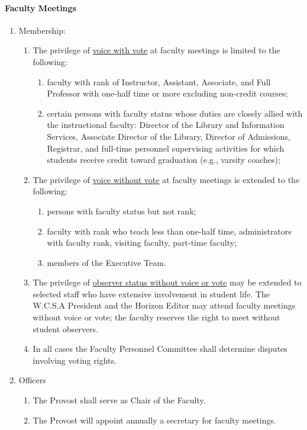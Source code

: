 			\paragraph{Faculty Meetings}
				\label{sec:FacultyMeetings}
				\begin{enumerate}[label=\alph*)]
					\item{Membership:
						\begin{enumerate}[label=\arabic*)]
							\item{The privilege of \underline {voice with vote} at faculty meetings is limited to the following:
								\begin{enumerate}[label=(\alph*)]
									\item{ faculty with rank of Instructor,
										Assistant, Associate, and Full Professor with
										one-half time or more excluding non-credit
										courses;}
									\item{ certain persons with faculty status whose
										duties are closely allied with the instructional
										faculty:  Director of the Library and
										Information Services, Associate Director of the
										Library, Director of Admissions, Registrar, and
										full-time personnel supervising activities for
										which students receive credit toward graduation
										(e.g., varsity coaches);}
								\end{enumerate}
							}
							\item{The privilege of \underline{voice without vote} at faculty meetings is extended to the following:
								\begin{enumerate}[label=(\alph*)]
									\item{ persons with faculty status but not
										rank;}
									\item{ faculty with rank who teach less than
										one-half time, administrators with faculty rank,
										visiting faculty, part-time faculty;}
									\item{ members of the Executive Team.}
								\end{enumerate}
							}
							\item{The privilege of \underline{observer status without voice or vote} may be extended to selected staff who have extensive involvement in student life.  The W.C.S.A President and the Horizon Editor may attend faculty meetings without voice or vote; the faculty reserves the right to meet without student observers.}
							\item{In all cases the Faculty Personnel Committee shall determine disputes involving voting rights.}
						\end{enumerate}
					}
					\item{Officers
						\begin{enumerate}[label=\arabic*)]
							\item{The Provost shall serve as Chair of the Faculty.}
							\item{The Provost will appoint annually a secretary for faculty meetings.}


\end{enumerate}}
\end{enumerate}
